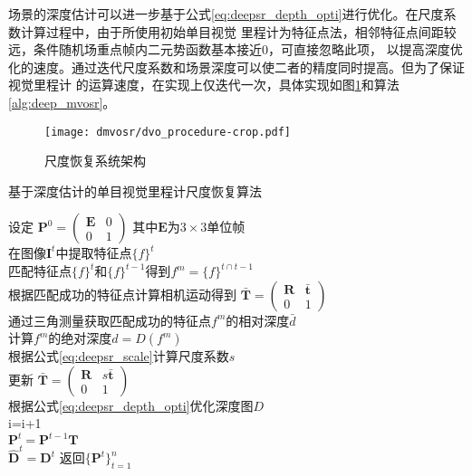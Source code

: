 场景的深度估计可以进一步基于公式\eqref{eq:deepsr_depth_opti}进行优化。在尺度系数计算过程中，由于所使用初始单目视觉
里程计为特征点法，相邻特征点间距较远，条件随机场重点帧内二元势函数基本接近0，可直接忽略此项，
以提高深度优化的速度。通过迭代尺度系数和场景深度可以使二者的精度同时提高。但为了保证视觉里程计
的运算速度，在实现上仅迭代一次，具体实现如图\ref{fig:deepsr_system_structure}和算法\ref{alg:deep_mvosr}。
\begin{figure}[h]
    \centering
    \texttt{[image: dmvosr/dvo\_procedure-crop.pdf]}
    \caption{尺度恢复系统架构}
    \label{fig:deepsr_system_structure}
\end{figure}
\begin{algorithm}[h]
    \caption{基于深度估计的单目视觉里程计尺度恢复算法}
    设定 $\mathbf{P}^0 = \begin{pmatrix}
        \mathbf{E}& 0\\
        0 &1
    \end{pmatrix}$ 其中$\mathbf{E}$为$3\times3$单位帧\\
    {   
        在图像$\mathbf{I}^t$中提取特征点$\{f\}^t$\\
        {
            匹配特征点$\{f\}^t$和$\{f\}^{t-1}$得到$f^m = \{f\}^{t\cap t-1}$\\
            根据匹配成功的特征点计算相机运动得到
            $\mathbf{\bar{T}} = \begin{pmatrix}
                \mathbf{R}& \mathbf{\bar{t}}\\
                0 &1
            \end{pmatrix}$\\
            通过三角测量获取匹配成功的特征点$f^m$的相对深度$\bar{d}$\\
            {
                计算$f^m$的绝对深度$d = D(f^m)$\\
                根据公式\eqref{eq:deepsr_scale}计算尺度系数$s$\\
                更新 $\mathbf{\bar{T}} = \begin{pmatrix}
                    \mathbf{R}& s\mathbf{\bar{t}}\\
                    0 &1
                \end{pmatrix}$\\
                根据公式\eqref{eq:deepsr_depth_opti}优化深度图$D$\\
                i=i+1\\
            }
            $\mathbf{P}^t = \mathbf{P}^{t-1}\mathbf{T}$\\
            $\hat{\mathbf{D}}^t = \mathbf{D}^t$
        }
    }
    返回$\{\mathbf{P}^t\}_{t=1}^n$
  \label{alg:deep_mvosr}
\end{algorithm}


